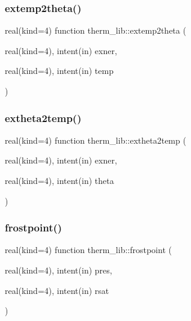 \subsubsection{\texorpdfstring{extemp2theta()}{extemp2theta()}}
{\footnotesize\ttfamily real(kind=4) function therm\+\_\+lib\+::extemp2theta (\begin{DoxyParamCaption}\item[{real(kind=4), intent(in)}]{exner,  }\item[{real(kind=4), intent(in)}]{temp }\end{DoxyParamCaption})}

\mbox{\label{namespacetherm__lib_a04fbafe4252bacbd01867388f45d8104}} 
\subsubsection{\texorpdfstring{extheta2temp()}{extheta2temp()}}
{\footnotesize\ttfamily real(kind=4) function therm\+\_\+lib\+::extheta2temp (\begin{DoxyParamCaption}\item[{real(kind=4), intent(in)}]{exner,  }\item[{real(kind=4), intent(in)}]{theta }\end{DoxyParamCaption})}

\mbox{\label{namespacetherm__lib_aa7fff31ade0f9d6070e4bc986e0f5e24}} 
\subsubsection{\texorpdfstring{frostpoint()}{frostpoint()}}
{\footnotesize\ttfamily real(kind=4) function therm\+\_\+lib\+::frostpoint (\begin{DoxyParamCaption}\item[{real(kind=4), intent(in)}]{pres,  }\item[{real(kind=4), intent(in)}]{rsat }\end{DoxyParamCaption})}


